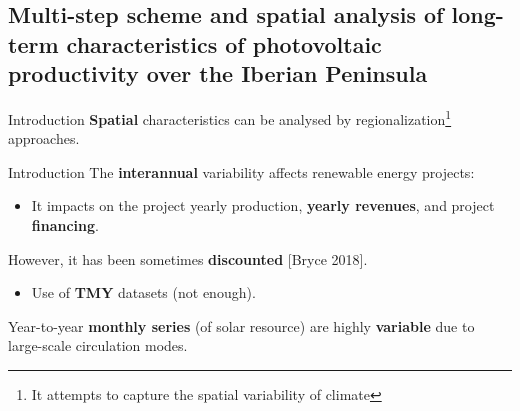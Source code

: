\documentclass{beamer}%
\begin{document}
\subsection{Multi-step scheme and spatial analysis of long-term characteristics of photovoltaic productivity over the Iberian Peninsula}

\begin{frame}[standout]
\end{frame}

\begin{frame}[fragile]{Introduction}
\vspace{1\baselineskip}
 {\textbf{Spatial} characteristics can be analysed by \alert{regionalization}\footnote{It attempts to capture the spatial variability of climate} approaches.\\}
\vspace{1\baselineskip}
\end{frame}

\begin{frame}[fragile]{Introduction}
The \textbf{\alert{interannual}} variability affects renewable energy projects:   
  \begin{itemize}
  \item It impacts on the project yearly production, \textbf{yearly revenues}, and project \textbf{financing}.
  \end{itemize}
However, it has been sometimes \textbf{\alert{discounted}} [Bryce 2018].
  \begin{itemize}
  \item Use of \textbf{TMY} datasets (not enough).
  \end{itemize}
Year-to-year \textbf{\alert{monthly series}} (of solar resource) are highly \textbf{variable} due to large-scale circulation modes.   
\end{frame}
\end{document}
